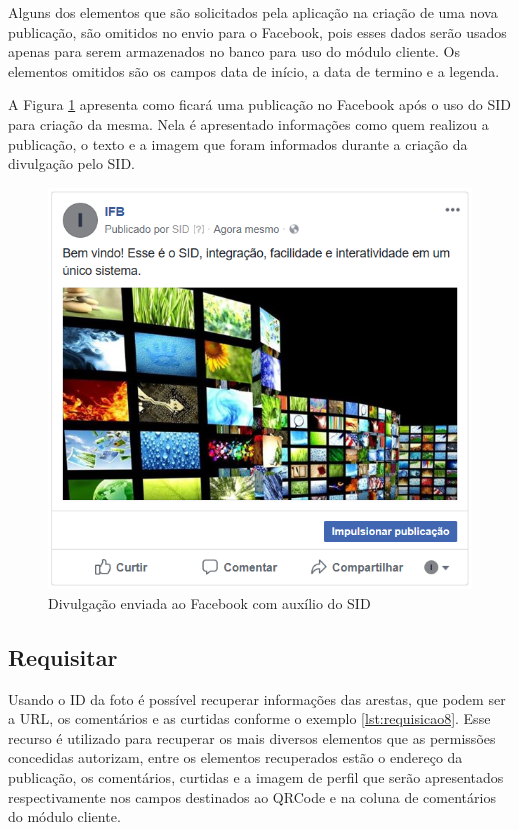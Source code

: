 Alguns dos elementos que são solicitados pela aplicação na criação de uma nova publicação, são omitidos no envio para o Facebook, pois esses dados serão usados apenas para serem armazenados no banco para uso do módulo cliente. Os elementos omitidos são os campos data de início, a data de termino e a legenda. 

A Figura \ref{fig:imgfacebook1} apresenta como ficará uma publicação no Facebook após o uso do SID para criação da mesma. Nela é apresentado informações como quem realizou a publicação, o texto e a imagem que foram informados durante a criação da divulgação pelo SID.

\begin{figure}[H]
\centering
\includegraphics[scale=1]{figuras/imgfacebook1}
\caption{Divulgação enviada ao Facebook com auxílio do SID}
\label{fig:imgfacebook1}
\end{figure}


\subsection{Requisitar}
Usando o ID da foto é possível recuperar informações das arestas, que podem ser a URL, os comentários e as curtidas conforme o exemplo \ref{lst:requisicao8}. Esse recurso é utilizado para recuperar os mais diversos elementos que as permissões concedidas autorizam, entre os elementos recuperados estão o endereço da publicação, os comentários, curtidas e a imagem de perfil que serão apresentados respectivamente nos campos destinados ao QRCode e na coluna de comentários do módulo cliente.

